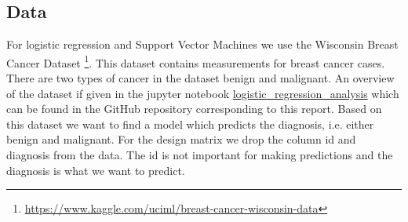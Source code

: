 \subsection{Data} \label{subsec:data_logistic_regression}
For logistic regression and Support Vector Machines we use the Wisconsin Breast Cancer Dataset \footnote{\url{https://www.kaggle.com/uciml/breast-cancer-wisconsin-data}}. This dataset contains measurements for breast cancer cases. There are two types of cancer in the dataset benign and malignant. An overview of the dataset if given in the jupyter notebook \href{https://github.com/am-kaiser/CompSci-Project-1/blob/main/regression_analysis/examples/logistic_regression_analysis.ipynb}{logistic\_regression\_analysis} which can be found in the GitHub repository corresponding to this report. Based on this dataset we want to find a model which predicts the diagnosis, i.e. either benign and malignant. For the design matrix we drop the column id and diagnosis from the data. The id is not important for making predictions and the diagnosis is what we want to predict.